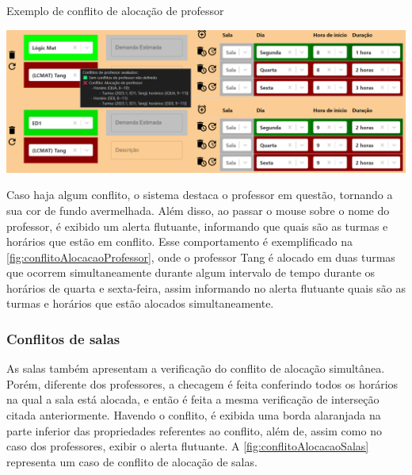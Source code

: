 \begin{MyCenteredFigure} \caption{Exemplo de conflito de alocação de professor} \label{fig:conflitoAlocacaoProfessor}
  \includegraphics[width=\textwidth]{files/img/2.02!5-desenvolvimento/2.02!5.1.5-conflitos/Alocação de professores}
\end{MyCenteredFigure}

Caso haja algum conflito, o sistema destaca o professor em questão, tornando a sua cor de fundo avermelhada. Além disso, ao passar o mouse sobre o nome do professor, é exibido um alerta flutuante, informando que quais são as turmas e horários que estão em conflito. Esse comportamento é exemplificado na \autoref{fig:conflitoAlocacaoProfessor}, onde o professor Tang é alocado em duas turmas que ocorrem simultaneamente durante algum intervalo de tempo durante os horários de quarta e sexta-feira, assim informando no alerta flutuante quais são as turmas e horários que estão alocados simultaneamente.

\subsubsection*{Conflitos de salas} \label{sssec:Salas}

As salas também apresentam a verificação do conflito de alocação simultânea. Porém, diferente dos professores, a checagem é feita conferindo todos os horários na qual a sala está alocada, e então é feita a mesma verificação de interseção citada anteriormente. Havendo o conflito, é exibida uma borda alaranjada na parte inferior das propriedades referentes ao conflito, além de, assim como no caso dos professores, exibir o alerta flutuante. A \autoref{fig:conflitoAlocacaoSalas} representa um caso de conflito de alocação de salas.

